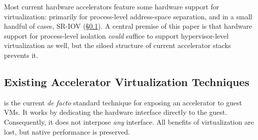  Most current hardware
accelerators feature some hardware support for virtualization: primarily for process-level
address-space separation, and in a small handful of cases, SR-IOV (\S\ref{s:bg_tech}).
A central premise of this paper is that hardware support for process-level isolation \emph{could}
suffice to support hypervisor-level virtualization as well, but the siloed structure of current accelerator stacks prevents it.

\subsection{Existing Accelerator Virtualization Techniques}
\label{s:bg_tech}


%


is the current \emph{de facto} standard technique for exposing an accelerator to guest VMs.
It works by dedicating the hardware interface directly to the guest. Consequently,
it does not interpose \emph{any} interface. All benefits of virtualization are lost,
but native performance is preserved.

